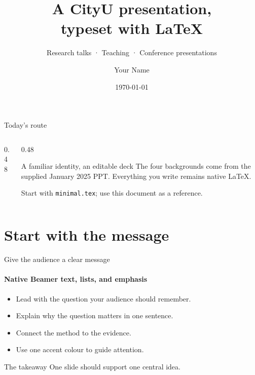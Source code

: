 \documentclass[aspectratio=169,11pt,t]{beamer}
\title[CityU Beamer · January 2025 identity]{A CityU presentation,\\typeset with \LaTeX}
\subtitle{Research talks · Teaching · Conference presentations}
\author{Your Name}
\institute{Department / Research Group\\City University of Hong Kong}
\date{\today}
\begin{document}
\cityutitlepage

\begin{frame}{Today's route}
  \begin{columns}[T,onlytextwidth]
    \begin{column}{0.48\textwidth}
      \tableofcontents
    \end{column}
    \begin{column}{0.48\textwidth}
      \begin{block}{A familiar identity, an editable deck}
        The four backgrounds come from the supplied January 2025 PPT.
        Everything you write remains native \LaTeX.
      \end{block}
      \small
      Start with \texttt{minimal.tex}; use this document as a reference.
    \end{column}
  \end{columns}
\end{frame}

\section{Start with the message}

\begin{frame}{Give the audience a clear message}
  \framesubtitle{Native Beamer text, lists, and emphasis}
  \begin{itemize}
    \item Lead with the question your audience should remember.
    \item Explain why the question matters in one sentence.
    \item Connect the method to the evidence.
    \item Use \alert{one accent colour} to guide attention.
  \end{itemize}
  \medskip
  \begin{block}{The takeaway}
    One slide should support one central idea.
  \end{block}
\end{frame}
\end{document}
